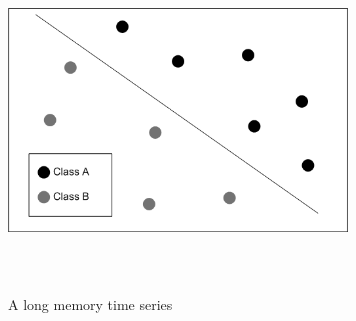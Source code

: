 \begin{figure}[ht]
\begin{center}
\includegraphics[height = 9cm, width = 9cm]{img/linear-classifier.png}
\caption{A long memory time series\label{ts1}}
\end{center}
\end{figure}




